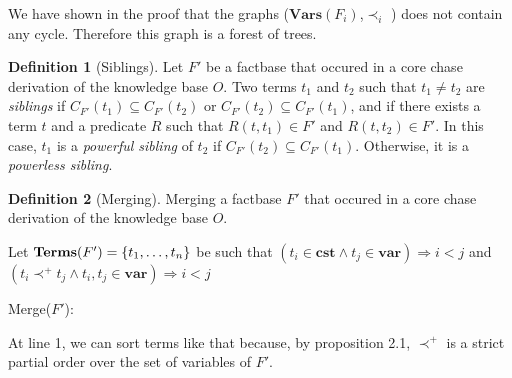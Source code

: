 \documentclass{article}
\theoremstyle{definition}
\newtheorem{definition}{Definition}[section]
\theoremstyle{remark}
\newcommand{\Vars}{\textbf{Vars}}
\newcommand{\Terms}{\textbf{Terms}}
\begin{document}
We have shown in the proof that the graphs ($\Vars(F_i)$,$\prec_i$ ) does not contain any cycle. Therefore this graph is a forest of trees. 

%


\begin{definition}[Siblings]
Let $F'$ be a factbase that occured in a core chase derivation of the knowledge base $O$. Two terms $t_1$ and $t_2$ such that $t_1 \neq t_2$ are \emph{siblings} if $C_{F'}(t_1) \subseteq C_{F'}(t_2)$ or $C_{F'}(t_2) \subseteq C_{F'}(t_1)$, and if there exists a term $t$ and a predicate $R$ such that $R(t,t_1) \in F'$ and $R(t,t_2) \in F'$. In this case, $t_1$ is a \emph{powerful sibling} of $t_2$ if $C_{F'}(t_2) \subseteq C_{F'}(t_1)$. Otherwise, it is a \emph{powerless sibling}.
\end{definition}

\begin{definition}[Merging]
Merging a factbase $F'$ that occured in a core chase derivation of the knowledge base $O$.

\begin{algorithm}[H]
\SetAlgoLined


    Let $\textbf{\Terms}(F') = \{t_1,\ldots, t_n\}$ be such that  $(t_i \in \textbf{cst} \wedge t_j \in \textbf{var}) \Rightarrow i < j$ and $(t_i \prec^+ t_j \wedge t_i,t_j \in \textbf{var}) \Rightarrow i < j$ \;
\caption{Merge($F'$):}


\end{algorithm}
At line 1, we can sort terms like that because, by proposition 2.1, $\prec^+$ is a strict partial order over the set of variables of $F'$.
\end{definition}
\end{document}
